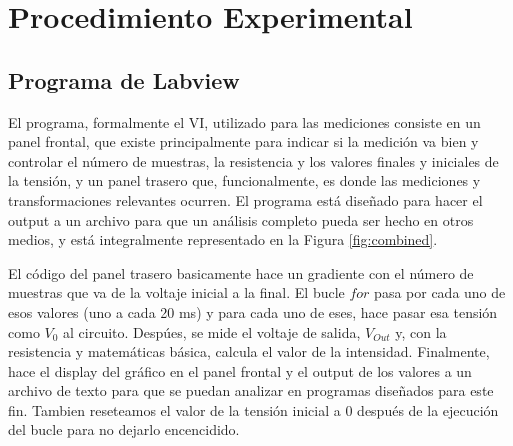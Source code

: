 \documentclass[a4paper,12pt]{article}
\begin{document}
\section{Procedimiento Experimental}



\subsection{Programa de Labview}
El programa, formalmente el VI, utilizado para las mediciones consiste en un panel frontal, que existe principalmente para indicar si la medición va bien y controlar el número de muestras, la resistencia y los valores finales y iniciales de la tensión, y un panel trasero que, funcionalmente, es donde las mediciones y transformaciones relevantes ocurren. El programa está diseñado para hacer el output a un archivo para que un análisis completo pueda ser hecho en otros medios, y está integralmente representado en la Figura \ref{fig:combined}.

El código del panel trasero basicamente hace un gradiente con el número de muestras que va de la voltaje inicial a la final. El bucle $for$ pasa por cada uno de esos valores (uno a cada 20 ms) y para cada uno de eses, hace pasar esa tensión como $V_{0}$ al circuito. Despúes, se mide el voltaje de salida, $V_{Out}$ y, con la resistencia y matemáticas básica, calcula el valor de la intensidad. Finalmente, hace el display del gráfico en el panel frontal y el output de los valores a un archivo de texto para que se puedan analizar en programas diseñados para este fin. Tambien reseteamos el valor de la tensión inicial a 0 después de la ejecución del bucle para no dejarlo encencidido.
\end{document}
